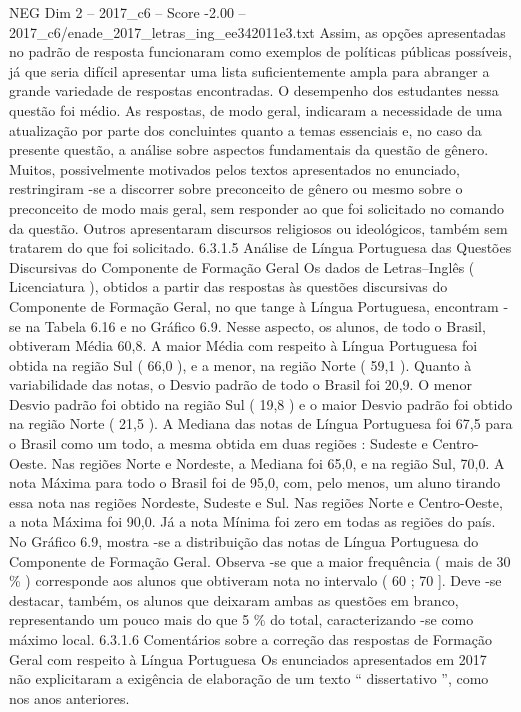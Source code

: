 \begin{textsample}{NEG Dim 2 – 2017\_c6 – Score -2.00 – 2017\_c6/enade\_2017\_letras\_ing\_ee342011e3.txt}
Assim, as opções apresentadas no padrão de resposta funcionaram como exemplos de políticas públicas possíveis, já que seria difícil apresentar uma lista suficientemente ampla para abranger a grande variedade de respostas encontradas.
O desempenho dos estudantes nessa questão foi médio.
As respostas, de modo geral, indicaram a necessidade de uma atualização por parte dos concluintes quanto a temas essenciais e, no caso da presente questão, a análise sobre aspectos fundamentais da questão de gênero.
Muitos, possivelmente motivados pelos textos apresentados no enunciado, restringiram -se a discorrer sobre preconceito de gênero ou mesmo sobre o preconceito de modo mais geral, sem responder ao que foi solicitado no comando da questão.
Outros apresentaram discursos religiosos ou ideológicos, também sem tratarem do que foi solicitado. 6.3.1.5 Análise de Língua Portuguesa das Questões Discursivas do Componente de Formação Geral Os dados de Letras–Inglês ( Licenciatura ), obtidos a partir das respostas às questões discursivas do Componente de Formação Geral, no que tange à Língua Portuguesa, encontram -se na Tabela 6.16 e no Gráfico 6.9.
Nesse aspecto, os alunos, de todo o Brasil, obtiveram Média 60,8.
A maior Média com respeito à Língua Portuguesa foi obtida na região Sul ( 66,0 ), e a menor, na região Norte ( 59,1 ).
Quanto à variabilidade das notas, o Desvio padrão de todo o Brasil foi 20,9.
O menor Desvio padrão foi obtido na região Sul ( 19,8 ) e o maior Desvio padrão foi obtido na região Norte ( 21,5 ).
A Mediana das notas de Língua Portuguesa foi 67,5 para o Brasil como um todo, a mesma obtida em duas regiões : Sudeste e Centro-Oeste.
Nas regiões Norte e Nordeste, a Mediana foi 65,0, e na região Sul, 70,0.
A nota Máxima para todo o Brasil foi de 95,0, com, pelo menos, um aluno tirando essa nota nas regiões Nordeste, Sudeste e Sul.
Nas regiões Norte e Centro-Oeste, a nota Máxima foi 90,0.
Já a nota Mínima foi zero em todas as regiões do país.
No Gráfico 6.9, mostra -se a distribuição das notas de Língua Portuguesa do Componente de Formação Geral.
Observa -se que a maior frequência ( mais de 30 \% ) corresponde aos alunos que obtiveram nota no intervalo ( 60 ; 70 ].
Deve -se destacar, também, os alunos que deixaram ambas as questões em branco, representando um pouco mais do que 5 \% do total, caracterizando -se como máximo local. 6.3.1.6 Comentários sobre a correção das respostas de Formação Geral com respeito à Língua Portuguesa Os enunciados apresentados em 2017 não explicitaram a exigência de elaboração de um texto “ dissertativo ”, como nos anos anteriores.

\end{textsample}
